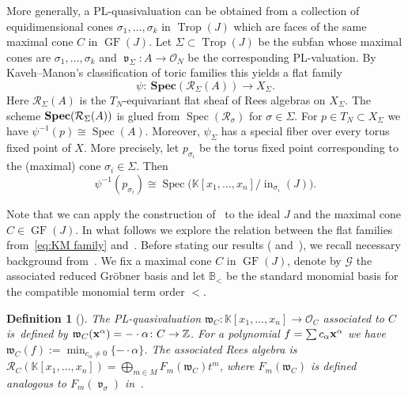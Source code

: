 \documentclass[pdftex]{sigma}%
\newtheorem{Definition}[Theorem]{Definition}
\numberwithin{equation}{section}
\DeclareMathOperator{\init}{in}
\DeclareMathOperator{\GF}{GF}
\DeclareMathOperator{\trop}{Trop}
\DeclareMathOperator{\val}{\mathfrak v}
\begin{document}
More generally, a PL-quasivaluation can be obtained from a collection of equidimensional cones $\sigma_1,\dots,\sigma_k$ in $\trop(J)$ which are faces of the same maximal cone $C$ in $\GF(J)$.
Let $\Sigma\subset \trop(J)$ be the subfan whose maximal cones are $\sigma_1,\dots,\sigma_k$ and $\val_{\Sigma}\colon A \to \mathcal O_N$ be the corresponding PL-valuation.
By Kaveh--Manon's classification of toric families this yields a flat family
\begin{equation}\label{eq:KM family}
\psi\colon\ \mathbf{Spec}(\mathcal R_\Sigma(A))\to X_\Sigma.
\end{equation}
Here $\mathcal R_\Sigma(A)$ is the $T_N$-equivariant flat sheaf of Rees algebras on $X_\Sigma$.
The scheme ${\bf Spec}(\mathcal{R}_{\Sigma}(A))$ is glued from $\operatorname{Spec}(\mathcal{R}_{\sigma})$ for $\sigma \in \Sigma$.
For $p\in T_N\subset X_{\Sigma}$ we have $\psi^{-1}(p)\cong \operatorname{Spec}(A)$.
Moreover, $\psi_\Sigma$ has a special fiber over every torus fixed point of $X$. More precisely, let $p_{\sigma_i}$ be the torus fixed point corresponding to the (maximal) cone $\sigma_i\in\Sigma$. Then
\begin{equation}\label{eq:fibers psi}
\psi^{-1}(p_{\sigma_i})\cong \operatorname{Spec}\big(\mathbb K[x_1,\dots,x_n]/\init_{\sigma_i}(J)\big).
\end{equation}



Note that we can apply the construction of~ to the ideal $J$ and the maximal cone $C\in \GF(J)$.
In what follows we explore the relation between the flat families from~\eqref{eq:KM family} and~.
Before stating our results ( and~), we recall necessary background from~\cite{KM-toricbundles}.
We fix a maximal cone $C$ in $\GF(J)$, denote by $\mathcal G$ the associated reduced Gr\"obner basis and let $\mathbb B_<$ be the standard monomial basis for the compatible monomial term order $<$.

\begin{Definition}[\cite{KM-toricbundles}]
The PL-quasivaluation $\mathfrak{w}_C\colon \mathbb K[x_1,\dots,x_n]\to \mathcal O_C$ associated to $C$ is~defi\-ned by $\mathfrak{w}_C({\bf x}^\alpha)= -\cdot \alpha\colon C\to \mathbb Z$.
For a polynomial $f=\sum c_\alpha {\bf x}^\alpha$ we have $\mathfrak{w}_C(f):=\min_{c_\alpha\not =0}\{ -\cdot \alpha\}$.
The associated Rees algebra is $\mathcal R_C(\mathbb K[x_1,\dots,x_n])=\bigoplus_{m\in M} F_m(\mathfrak{w}_C)t^m$, where
$F_m(\mathfrak{w}_C)$ is defined analogous to $F_m(\val_\sigma)$ in~.
\end{Definition}
\end{document}
